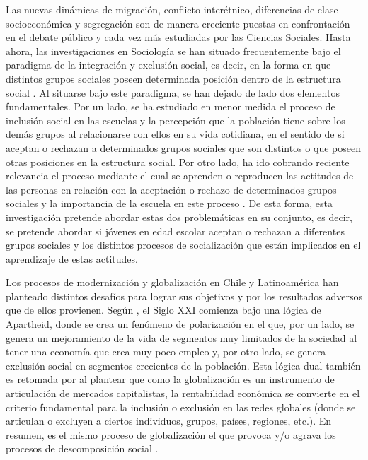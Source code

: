 \documentclass[12pt,twoside]{templates/facsothesis}
\begin{document}
Las nuevas dinámicas de migración, conflicto interétnico, diferencias de clase socioeconómica y segregación son de manera creciente puestas en confrontación en el debate público y cada vez más estudiadas por las Ciencias Sociales. Hasta ahora, las investigaciones en Sociología se han situado frecuentemente bajo el paradigma de la integración y exclusión social, es decir, en la forma en que distintos grupos sociales poseen determinada posición dentro de la estructura social \citep[ej.][]{young_justicia_2000, wade_raza_2000, viverosvigoya_interseccionalidad_2016}. Al situarse bajo este paradigma, se han dejado de lado dos elementos fundamentales. Por un lado, se ha estudiado en menor medida el proceso de inclusión social en las escuelas \citep{blanco_equidad_2006} y la percepción que la población tiene sobre los demás grupos al relacionarse con ellos en su vida cotidiana, en el sentido de si aceptan o rechazan a determinados grupos sociales que son distintos o que poseen otras posiciones en la estructura social. Por otro lado, ha ido cobrando reciente relevancia el proceso mediante el cual se aprenden o reproducen las actitudes de las personas en relación con la aceptación o rechazo de determinados grupos sociales y la importancia de la escuela en este proceso \citep{sandoval-hernandez_teaching_2018, malak-minkiewicz_influences_2021}. De esta forma, esta investigación pretende abordar estas dos problemáticas en su conjunto, es decir, se pretende abordar si jóvenes en edad escolar aceptan o rechazan a diferentes grupos sociales y los distintos procesos de socialización que están implicados en el aprendizaje de estas actitudes.

Los procesos de modernización y globalización en Chile y Latinoamérica han planteado distintos desafíos para lograr sus objetivos y por los resultados adversos que de ellos provienen. Según \citet{sunkel_sostenibilidad_1998}, el Siglo XXI comienza bajo una lógica de Apartheid, donde se crea un fenómeno de polarización en el que, por un lado, se genera un mejoramiento de la vida de segmentos muy limitados de la sociedad al tener una economía que crea muy poco empleo y, por otro lado, se genera exclusión social en segmentos crecientes de la población. Esta lógica dual también es retomada por \citet{castells_globalizacion_2005} al plantear que como la globalización es un instrumento de articulación de mercados capitalistas, la rentabilidad económica se convierte en el criterio fundamental para la inclusión o exclusión en las redes globales (donde se articulan o excluyen a ciertos individuos, grupos, países, regiones, etc.). En resumen, es el mismo proceso de globalización el que provoca y/o agrava los procesos de descomposición social \citep{lechner_debate_1992}.
\end{document}
